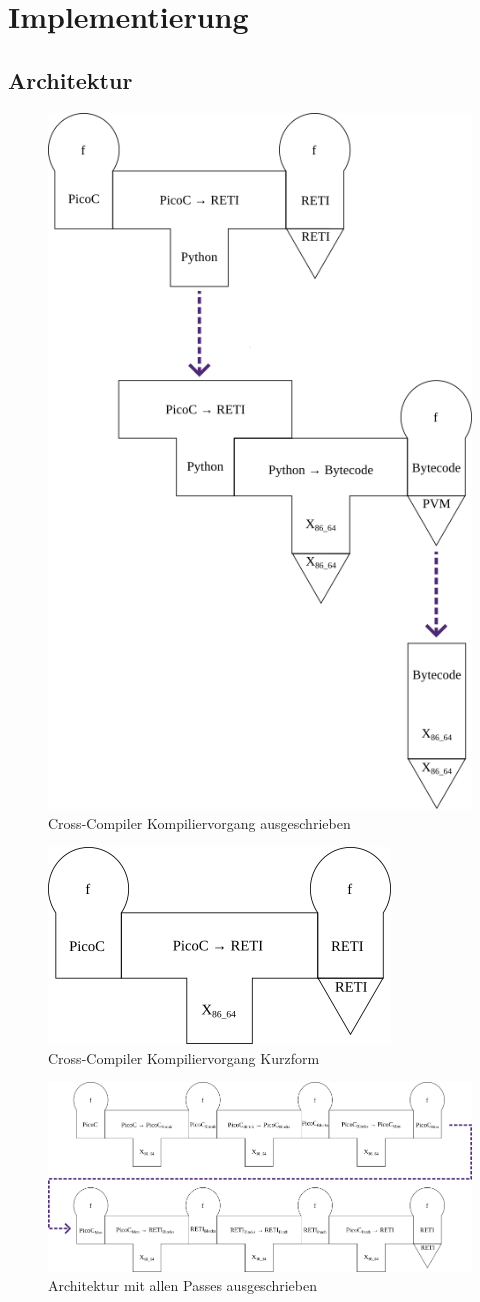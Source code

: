 
\chapter{Implementierung}
\label{ch:implementierung}
\section{Architektur}

\begin{figure}[H]
  \centering
  \includegraphics[width=0.5\linewidth]{./figures/summarized_cross_compiler.png}
  \caption{Cross-Compiler Kompiliervorgang ausgeschrieben}
\end{figure}

\begin{figure}[H]
  \centering
  \includegraphics[width=0.33\linewidth]{./figures/compiliervorang_mit_machiene.png}
  \caption{Cross-Compiler Kompiliervorgang Kurzform}
\end{figure}

\begin{figure}[H]
  \centering
  \includegraphics[width=\linewidth]{./figures/passes.png}
  \caption{Architektur mit allen Passes ausgeschrieben}
\end{figure}

